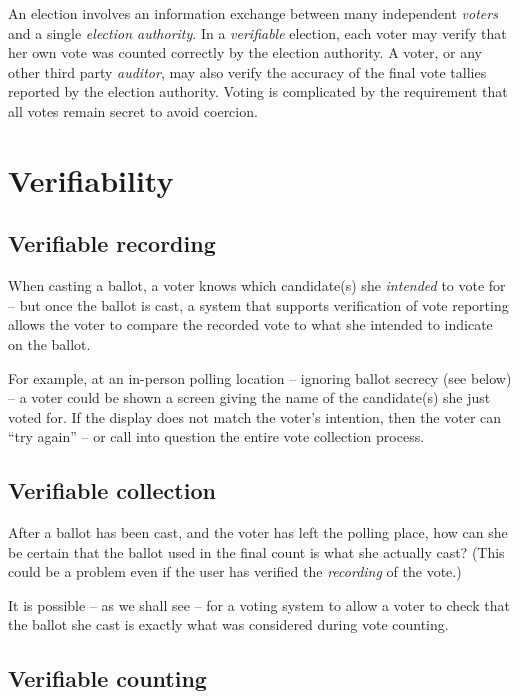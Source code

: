\documentclass[10pt,twocolumn]{article}
\newcommand{\term}[1]{\textit{#1}}
\begin{document}
An election involves an information exchange between many independent \term{voters} and a single
\term{election authority}.
In a \term{verifiable} election, each voter may verify that her own vote was counted correctly
by the election authority.
A voter, or any other third party \term{auditor}, may also verify the accuracy of the final vote tallies
reported by the election authority. \cite{preta}
Voting is complicated by the requirement that all votes remain secret to avoid coercion.

\section{Verifiability}

\subsection{Verifiable recording}

When casting a ballot, a voter knows which candidate(s) she \emph{intended} to vote for -- but
once the ballot is cast, a system that supports verification of vote reporting allows the voter to
compare the recorded vote to what she intended to indicate on the ballot.

For example, at an in-person polling location -- ignoring ballot secrecy (see below) -- a voter
could be shown a screen giving the name of the candidate(s) she just voted for. If the display
does not match the voter's intention, then the voter can ``try again'' -- or call into question the
entire vote collection process.

\subsection{Verifiable collection}

After a ballot has been cast, and the voter has left the polling place, how can she be certain
that the ballot used in the final count is what she actually cast? (This could be a problem even
if the user has verified the \emph{recording} of the vote.)

It is possible -- as we shall see -- for a voting system to allow a voter to check that the ballot
she cast is exactly what was considered during vote counting.

\subsection{Verifiable counting}
\end{document}

